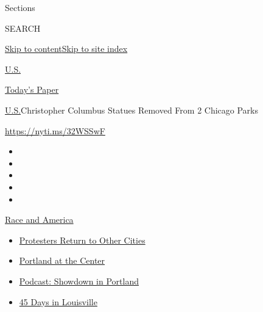 Sections

SEARCH

\protect\hyperlink{site-content}{Skip to
content}\protect\hyperlink{site-index}{Skip to site index}

\href{https://www.nytimes3xbfgragh.onion/section/us}{U.S.}

\href{https://myaccount.nytimes3xbfgragh.onion/auth/login?response_type=cookie\&client_id=vi}{}

\href{https://www.nytimes3xbfgragh.onion/section/todayspaper}{Today's
Paper}

\href{/section/us}{U.S.}\textbar{}Christopher Columbus Statues Removed
From 2 Chicago Parks

\url{https://nyti.ms/32WSSwF}

\begin{itemize}
\item
\item
\item
\item
\item
\end{itemize}

\href{https://www.nytimes3xbfgragh.onion/news-event/george-floyd-protests-minneapolis-new-york-los-angeles?action=click\&pgtype=Article\&state=default\&region=TOP_BANNER\&context=storylines_menu}{Race
and America}

\begin{itemize}
\tightlist
\item
  \href{https://www.nytimes3xbfgragh.onion/2020/07/26/us/protests-portland-seattle-trump.html?action=click\&pgtype=Article\&state=default\&region=TOP_BANNER\&context=storylines_menu}{Protesters
  Return to Other Cities}
\item
  \href{https://www.nytimes3xbfgragh.onion/2020/07/24/us/portland-oregon-protests-white-race.html?action=click\&pgtype=Article\&state=default\&region=TOP_BANNER\&context=storylines_menu}{Portland
  at the Center}
\item
  \href{https://www.nytimes3xbfgragh.onion/2020/07/23/podcasts/the-daily/portland-protests.html?action=click\&pgtype=Article\&state=default\&region=TOP_BANNER\&context=storylines_menu}{Podcast:
  Showdown in Portland}
\item
  \href{https://www.nytimes3xbfgragh.onion/interactive/2020/07/16/us/black-lives-matter-protests-louisville-breonna-taylor.html?action=click\&pgtype=Article\&state=default\&region=TOP_BANNER\&context=storylines_menu}{45
  Days in Louisville}
\end{itemize}

